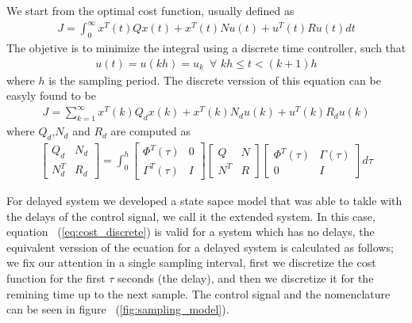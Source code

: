 \documentclass[nols]{tufte-handout}
\theoremstyle{definition}
\begin{document}
We start from the optimal cost function, usually defined as 
\begin{align}
    J=\int_{0}^{\infty} x^T(t)Qx(t)+x^T(t)Nu(t)+u^T(t)Ru(t) dt
\end{align}
The objetive is to minimize the integral using a discrete time controller, such that
\begin{align}
    u(t)=u(kh)=u_k \,\,\,\forall \,\,kh \leq t<(k+1)h
\end{align}
where $h$ is the sampling period.
The discrete verssion of this equation can be easyly found to be 
\begin{align}\label{eq:cost_discrete}
    J=\sum_{k=1}^{\infty}x^T\!(k)Q_dx(k)+x^T\!(k)N_du(k)+u^T\!(k)R_du(k)
\end{align}
where $Q_d$,$N_d$ and $R_d$ are computed as
\begin{align}
    \begin{bmatrix}
        Q_d & N_d\\
        N_d^T& R_d
    \end{bmatrix}=
    \int_0^h
    \begin{bmatrix}
        \Phi^T\!(\tau) & 0\\
        \Gamma^T\!(\tau)& I
    \end{bmatrix}
\begin{bmatrix}
    Q & N\\ 
    N^T & R
\end{bmatrix}
    \begin{bmatrix}
        \Phi^T\!(\tau) &  \Gamma(\tau)\\
       0 & I
    \end{bmatrix}d\tau
\end{align}


For delayed system we developed a state sapce model that was able to takle with the delays of the control signal, we call it the extended system. In this case, equation ~(\ref{eq:cost_discrete}) is valid for a system which has no delays, the equivalent verssion of the ecuation for a delayed system is calculated as follows; we fix our attention in a single sampling interval, first we discretize the cost function for the first $\tau$ seconds (the delay), and then we discretize it for the remining time up to the next sample. The control signal and the nomenclature can be seen in figure ~(\ref{fig:sampling_model}).
\end{document}
